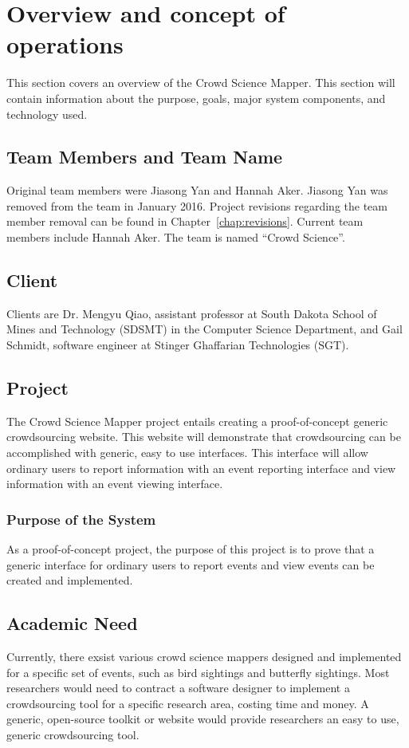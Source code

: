 

\chapter{Overview and concept of operations}

This section covers an overview of the Crowd Science Mapper. This section will contain information about the purpose, goals, major system components, and technology used.

\section{Team Members and Team Name}
Original team members were Jiasong Yan and Hannah Aker.  Jiasong Yan was removed from the team in January 2016. Project revisions regarding the team member removal can be found in Chapter~\ref{chap:revisions}. Current team members include Hannah Aker. The team is named ``Crowd Science''.

\section{Client}
Clients are Dr. Mengyu Qiao, assistant professor at South Dakota School of Mines and Technology (SDSMT) in the Computer Science Department, and Gail Schmidt, software engineer at Stinger Ghaffarian Technologies (SGT).

\section{Project}
The Crowd Science Mapper project entails creating a proof-of-concept generic crowdsourcing website. This website will demonstrate that crowdsourcing can be accomplished with generic, easy to use interfaces. This interface will allow ordinary users to report information with an event reporting interface and view information with an event viewing interface.

\subsection{Purpose of the System}
As a proof-of-concept project, the purpose of this project is to prove that a generic interface for ordinary users to report events and view events can be created and implemented.

\section{Academic Need}
Currently, there exsist various crowd science mappers designed and implemented for a specific set of events, such as bird sightings and butterfly sightings. Most researchers would need to contract a software designer to implement a crowdsourcing tool for a specific research area, costing time and money. A generic, open-source toolkit or website would provide researchers an easy to use, generic crowdsourcing tool.

